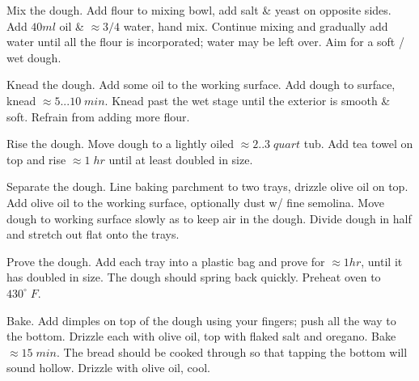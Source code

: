 \begin{preparation}
\item Mix the dough.
Add flour to mixing bowl, add salt \& yeast on opposite sides.
Add $40ml$ oil \& $\approx 3/4$ water, hand mix.
Continue mixing and gradually add water until all the flour is incorporated; water may be left over.
Aim for a soft / wet dough.

\item Knead the dough.
Add some oil to the working surface.
Add dough to surface, knead $\approx 5...10\;min$.
Knead past the wet stage until the exterior is smooth \& soft.
Refrain from adding more flour.

\item Rise the dough.
Move dough to a lightly oiled $\approx 2..3\; quart$ tub.
Add tea towel on top and rise $\approx 1\;hr$ until at least doubled in size.

\item Separate the dough.
Line baking parchment to two trays, drizzle olive oil on top.
Add olive oil to the working surface, optionally dust w/ fine semolina.
Move dough to working surface slowly as to keep air in the dough.
Divide dough in half and stretch out flat onto the trays.

\item Prove the dough.
Add each tray into a plastic bag and prove for $\approx 1 hr$, until it has doubled in size.
The dough should spring back quickly.
Preheat oven to $430^\circ \; F$.

\item Bake.
Add dimples on top of the dough using your fingers; push all the way to the bottom.
Drizzle each with olive oil, top with flaked salt and oregano.
Bake $\approx 15 \; min$.
The bread should be cooked through so that tapping the bottom will sound hollow.
Drizzle with olive oil, cool.

\end{preparation}

\recipeend